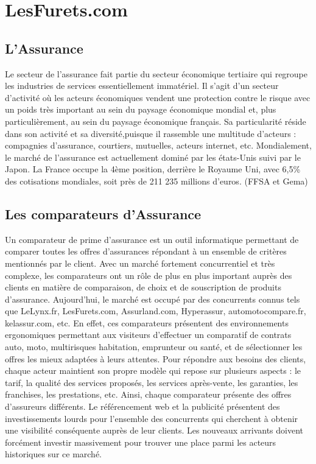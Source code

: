 \chapter{LesFurets.com}

\section{L'Assurance}
Le secteur de l’assurance fait partie du secteur économique tertiaire qui regroupe les
industries de services essentiellement immatériel. Il s’agit d’un secteur d’activité où les
acteurs économiques vendent une protection contre le risque avec un poids très important
au sein du paysage économique mondial et, plus particulièrement, au sein du paysage
économique français. Sa particularité réside dans son activité et sa diversité,puisque il
rassemble une multitude d’acteurs : compagnies d’assurance, courtiers, mutuelles, acteurs
internet, etc. Mondialement, le marché de l’assurance est actuellement dominé par les
états-Unis suivi par le Japon. La France occupe la 4ème position, derrière le Royaume Uni,
avec 6,5\% des cotisations mondiales, soit près de 211 235 millions d’euros. (FFSA
et Gema)

\section{Les comparateurs d'Assurance}
Un comparateur de prime d’assurance est un outil informatique permettant de comparer
toutes les offres d’assurances répondant à un ensemble de critères mentionnés par
le client. Avec un marché fortement concurrentiel et très complexe, les comparateurs ont
un rôle de plus en plus important auprès des clients en matière de comparaison, de choix
et de souscription de produits d’assurance. Aujourd’hui, le marché est occupé par des
concurrents connus tels que LeLynx.fr, LesFurets.com, Assurland.com, Hyperassur, automotocompare.fr,
kelassur.com, etc. En effet, ces comparateurs présentent des environnements
ergonomiques permettant aux visiteurs d’effectuer un comparatif de contrats auto,
moto, multirisques habitation, emprunteur ou santé, et de sélectionner les offres les mieux
adaptées à leurs attentes. Pour répondre aux besoins des clients, chaque acteur maintient son propre modèle qui repose sur plusieurs aspects : le tarif, la qualité des services proposés,
les services après-vente, les garanties, les franchises, les prestations, etc. Ainsi, chaque
comparateur présente des offres d’assureurs différents. Le référencement web et la publicité
présentent des investissements lourds pour l’ensemble des concurrents qui cherchent
à obtenir une visibilité conséquente auprès de leur clients. Les nouveaux arrivants doivent
forcément investir massivement pour trouver une place parmi les acteurs historiques sur
ce marché.

